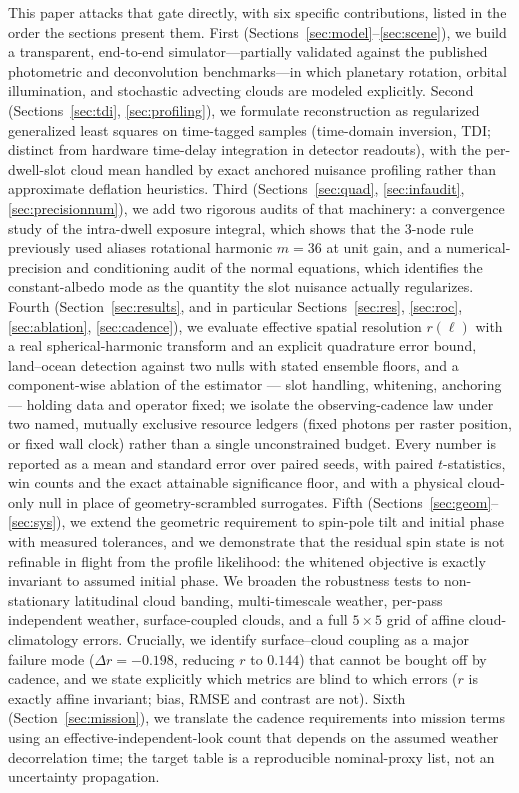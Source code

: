 \documentclass[twocolumn,10pt]{article}
\begin{document}
This paper attacks that gate directly, with six specific contributions, listed
in the order the sections present them.
First (Sections~\ref{sec:model}--\ref{sec:scene}), we build a transparent,
end-to-end simulator---partially validated against the published photometric
and deconvolution benchmarks---in which planetary rotation, orbital
illumination, and stochastic advecting clouds are modeled explicitly.
Second (Sections~\ref{sec:tdi}, \ref{sec:profiling}), we formulate
reconstruction as regularized generalized least squares on time-tagged samples
(time-domain inversion, TDI; distinct from hardware time-delay integration in
detector readouts), with the per-dwell-slot cloud mean handled by exact
anchored nuisance profiling rather than approximate deflation heuristics.
Third (Sections~\ref{sec:quad}, \ref{sec:infaudit}, \ref{sec:precisionnum}), we
add two rigorous audits of that machinery: a convergence study of the
intra-dwell exposure integral, which shows that the 3-node rule previously used
aliases rotational harmonic $m=36$ at unit gain, and a numerical-precision and
conditioning audit of the normal equations, which identifies the
constant-albedo mode as the quantity the slot nuisance actually regularizes.
Fourth (Section~\ref{sec:results}, and in particular
Sections~\ref{sec:res}, \ref{sec:roc}, \ref{sec:ablation}, \ref{sec:cadence}),
we evaluate effective spatial resolution $r(\ell)$ with a real
spherical-harmonic transform and an explicit quadrature error bound, land--ocean
detection against two nulls with stated ensemble floors, and a component-wise
ablation of the estimator --- slot handling, whitening, anchoring --- holding
data and operator fixed; we isolate the observing-cadence law under two named,
mutually exclusive resource ledgers (fixed photons per raster position, or
fixed wall clock) rather than a single unconstrained budget. Every number is
reported as a mean and standard error over paired seeds, with paired
$t$-statistics, win counts and the exact attainable significance floor, and
with a physical cloud-only null in place of geometry-scrambled surrogates.
Fifth (Sections~\ref{sec:geom}--\ref{sec:sys}), we extend the geometric
requirement to spin-pole tilt and initial phase with measured tolerances, and
we demonstrate that the residual spin state is not refinable in flight from the
profile likelihood: the whitened objective is exactly invariant to assumed
initial phase. We broaden the robustness tests to non-stationary latitudinal
cloud banding, multi-timescale weather, per-pass independent weather,
surface-coupled clouds, and a full $5\times5$ grid of affine cloud-climatology
errors. Crucially, we identify surface--cloud coupling as a major failure mode
($\Delta r = -0.198$, reducing $r$ to $0.144$) that cannot be bought off by
cadence, and we state explicitly which metrics are blind to which errors ($r$
is exactly affine invariant; bias, RMSE and contrast are not).
Sixth (Section~\ref{sec:mission}), we translate the cadence requirements into
mission terms using an effective-independent-look count that depends on the
assumed weather decorrelation time; the target table is a reproducible
nominal-proxy list, not an uncertainty propagation.
\end{document}
